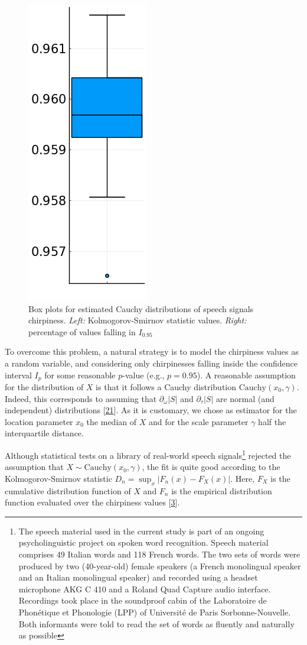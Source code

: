 \documentclass[american,]{article}
\theoremstyle{definition}
\theoremstyle{definition}
\theoremstyle{definition}
\theoremstyle{remark}
\begin{document}
\begin{figure}[H]
\begin{minipage}{.47\linewidth}
        \includegraphics[width=.27\textwidth]{img/cauchy_values_percentage_iqr_2.png}
    \caption{Box plots for estimated Cauchy distributions of speech signals chirpiness.
    \emph{Left:} Kolmogorov-Smirnov statistic values.
    \emph{Right:} percentage of values falling in $I_{0.95}$}
    \end{minipage}
\end{figure}

To overcome this problem, a natural strategy is to model the chirpiness values as
a random variable, and considering only chirpinesses falling inside the confidence
interval \(I_p\) for some reasonable \(p\)-value (e.g., \(p=0.95\)).
A reasonable assumption for the distribution of \(X\) is that it follows
a Cauchy distribution \(\mathrm{Cauchy}(x_0, \gamma)\).
Indeed, this corresponds to assuming that \(\partial_\omega\left\lvert S\right\rvert\) and
\(\partial_\tau\left\lvert S\right\rvert\) are normal (and independent) distributions {[}\protect\hyperlink{ref-papoulis1991}{21}{]}.
As it is customary, we chose as estimator for the location parameter \(x_0\) the median of \(X\)
and for the scale parameter \(\gamma\) half the interquartile distance.

Although statistical tests on a library of real-world speech signals\footnote{The speech material used in the current study is part of an ongoing
  psycholinguistic project on spoken word recognition.
  Speech material comprises 49 Italian words and 118 French words.
  The two sets of words were produced by two (40-year-old) female speakers
  (a French monolingual speaker and an Italian monolingual speaker) and recorded
  using a headset microphone AKG C 410 and a Roland Quad Capture audio interface.
  Recordings took place in the soundproof cabin of the Laboratoire de Phonétique
  et Phonologie (LPP) of Université de Paris Sorbonne-Nouvelle.
  Both informants were told to read the set of words as fluently and naturally as possible}
rejected the assumption that \(X\sim \mathrm{Cauchy}(x_0,\gamma)\),
the fit is quite good according to the Kolmogorov-Smirnov statistic
\(D_n=\sup_x\left\lvert F_n(x)-F_X(x)\right\rvert\). Here, \(F_X\) is the cumulative distribution function
of \(X\) and \(F_n\) is the empirical distribution function
evaluated over the chirpiness values {[}\protect\hyperlink{ref-asswad2021}{3}{]}.
\end{document}
